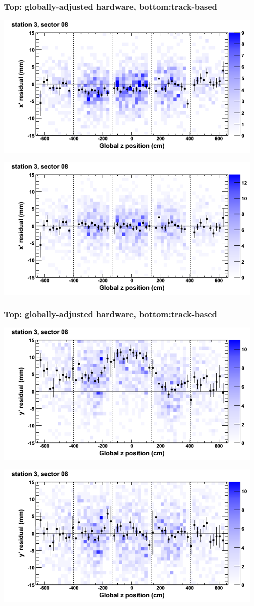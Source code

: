 \documentclass[compress]{beamer}
\begin{document}
\begin{frame}
\frametitle{Top: globally-adjusted hardware, bottom:track-based}
\includegraphics[width=0.7\linewidth]{NOV4_mapplots_HW/DTvsz_st3sec08_x.png}

\includegraphics[width=0.7\linewidth]{NOV4_mapplots/DTvsz_st3sec08_x.png}
\end{frame}

\begin{frame}
\frametitle{Top: globally-adjusted hardware, bottom:track-based}
\includegraphics[width=0.7\linewidth]{NOV4_mapplots_HW/DTvsz_st3sec08_y.png}

\includegraphics[width=0.7\linewidth]{NOV4_mapplots/DTvsz_st3sec08_y.png}
\end{frame}
\end{document}
